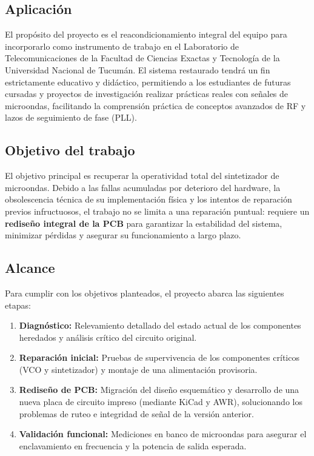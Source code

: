 \documentclass[12pt, a4paper]{article}
\begin{document}
	\subsection{Aplicación}
	
	El propósito del proyecto es el reacondicionamiento integral del equipo para incorporarlo como
	instrumento de trabajo en el Laboratorio de Telecomunicaciones de la Facultad de Ciencias Exactas y
	Tecnología de la Universidad Nacional de Tucumán. El sistema restaurado tendrá un fin estrictamente
	educativo y didáctico, permitiendo a los estudiantes de futuras cursadas y proyectos de investigación
	realizar prácticas reales con señales de microondas, facilitando la comprensión práctica de conceptos
	avanzados de RF y lazos de seguimiento de fase (PLL).
	
	\subsection{Objetivo del trabajo}
	
	El objetivo principal es recuperar la operatividad total del sintetizador de microondas. Debido a las fallas
	acumuladas por deterioro del hardware, la obsolescencia técnica de su implementación física y los
	intentos de reparación previos infructuosos, el trabajo no se limita a una reparación puntual: requiere
	un \textbf{rediseño integral de la PCB} para garantizar la estabilidad del sistema, minimizar pérdidas y
	asegurar su funcionamiento a largo plazo.
	
	\subsection{Alcance}
	
	Para cumplir con los objetivos planteados, el proyecto abarca las siguientes etapas:
	
	\begin{enumerate}[leftmargin=*, label=\textbf{\arabic*.}]
		\item \textbf{Diagnóstico:} Relevamiento detallado del estado actual de los componentes heredados y
		análisis crítico del circuito original.
		\item \textbf{Reparación inicial:} Pruebas de supervivencia de los componentes críticos (VCO y
		sintetizador) y montaje de una alimentación provisoria.
		\item \textbf{Rediseño de PCB:} Migración del diseño esquemático y desarrollo de una nueva placa de
		circuito impreso (mediante KiCad y AWR), solucionando los problemas de ruteo e integridad de
		señal de la versión anterior.
		\item \textbf{Validación funcional:} Mediciones en banco de microondas para asegurar el enclavamiento
		en frecuencia y la potencia de salida esperada.
	\end{enumerate}
	
\end{document}
